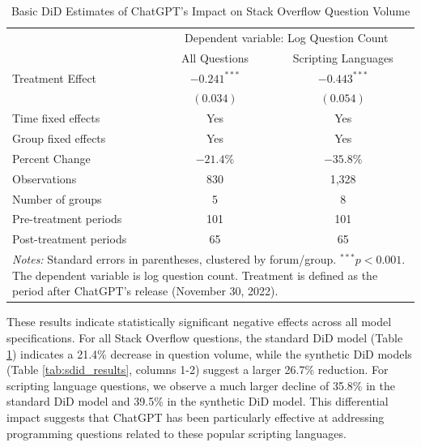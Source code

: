 \begin{table}[H]
    \centering
    \caption{Basic DiD Estimates of ChatGPT's Impact on Stack Overflow Question Volume}
    \label{tab:did_results}
    \begin{tabular}{lcc}
        \toprule
            & \multicolumn{2}{c}{Dependent variable: Log Question Count} \\
            \cmidrule(lr){2-3}
            & All Questions & Scripting Languages \\
        \midrule
            Treatment Effect & $-0.241^{***}$ & $-0.443^{***}$ \\
            & $(0.034)$ & $(0.054)$ \\
        \midrule
            Time fixed effects & Yes & Yes \\
            Group fixed effects & Yes & Yes \\
            Percent Change & $-21.4\%$ & $-35.8\%$ \\
        \midrule
            Observations & 830 & 1,328 \\
            Number of groups & 5 & 8 \\
            Pre-treatment periods & 101 & 101 \\
            Post-treatment periods & 65 & 65 \\
        \bottomrule
            \multicolumn{3}{p{0.95\linewidth}}{\footnotesize \textit{Notes:} Standard errors in parentheses, clustered by forum/group. $^{***}p<0.001$. The dependent variable is log question count. Treatment is defined as the period after ChatGPT's release (November 30, 2022).} \\
    \end{tabular}
\end{table}

These results indicate statistically significant negative effects across all model specifications. For all Stack Overflow questions, the standard DiD model (Table \ref{tab:did_results}) indicates a 21.4\% decrease in question volume, while the synthetic DiD models (Table \ref{tab:sdid_results}, columns 1-2) suggest a larger 26.7\% reduction. For scripting language questions, we observe a much larger decline of 35.8\% in the standard DiD model and 39.5\% in the synthetic DiD model. This differential impact suggests that ChatGPT has been particularly effective at addressing programming questions related to these popular scripting languages.


